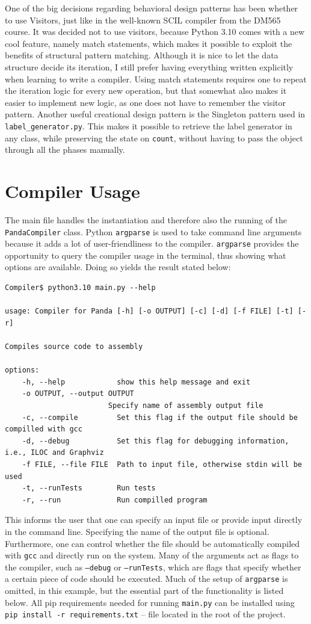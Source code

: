 One of the big decisions regarding behavioral design patterns has been whether to use Visitors, just like in the well-known SCIL compiler from the DM565 course. It was decided not to use visitors, because Python 3.10 comes with a new cool feature, namely match statements, which makes it possible to exploit the benefits of structural pattern matching. Although it is nice to let the data structure decide its iteration, I still prefer having everything written explicitly when learning to write a compiler. Using match statements requires one to repeat the iteration logic for every new operation, but that somewhat also makes it easier to implement new logic, as one does not have to remember the visitor pattern. Another useful creational design pattern is the Singleton pattern used in \texttt{label\_generator.py}. This makes it possible to retrieve the label generator in any class, while preserving the state on \texttt{count}, without having to pass the object through all the phases manually.

\section{Compiler Usage}
The main file handles the instantiation and therefore also the running of the \texttt{PandaCompiler} class. Python \texttt{argparse} is used to take command line arguments because it adds a lot of user-friendliness to the compiler. \texttt{argparse} provides the opportunity to query the compiler usage in the terminal, thus showing what options are available. Doing so yields the result stated below:

\begin{verbatim}
Compiler$ python3.10 main.py --help

usage: Compiler for Panda [-h] [-o OUTPUT] [-c] [-d] [-f FILE] [-t] [-r]

Compiles source code to assembly

options:
    -h, --help            show this help message and exit
    -o OUTPUT, --output OUTPUT
                        Specify name of assembly output file
    -c, --compile         Set this flag if the output file should be compilled with gcc
    -d, --debug           Set this flag for debugging information, i.e., ILOC and Graphviz
    -f FILE, --file FILE  Path to input file, otherwise stdin will be used
    -t, --runTests        Run tests
    -r, --run             Run compilled program
\end{verbatim}

This informs the user that one can specify an input file or provide input directly in the command line. Specifying the name of the output file is optional. Furthermore, one can control whether the file should be automatically compiled with \texttt{gcc} and directly run on the system. Many of the arguments act as flags to the compiler, such as \texttt{--debug} or \texttt{--runTests}, which are flags that specify whether a certain piece of code should be executed. Much of the setup of \texttt{argparse} is omitted, in this example, but the essential part of the functionality is listed below. All pip requirements needed for running \texttt{main.py} can be installed using \texttt{pip install -r requirements.txt} -- file located in the root of the project.


